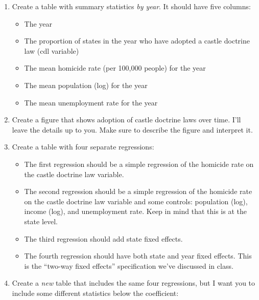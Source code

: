 \documentclass[
]{article}
\providecommand{\tightlist}{%
  \setlength{\itemsep}{0pt}\setlength{\parskip}{0pt}}
\begin{document}
\begin{enumerate}
\def\labelenumi{\arabic{enumi}.}
\tightlist
\item
  Create a table with summary statistics \emph{by year}. It should have five columns:

  \begin{itemize}
  \tightlist
  \item
    The year
  \item
    The proportion of states in the year who have adopted a castle doctrine law (cdl variable)
  \item
    The mean homicide rate (per 100,000 people) for the year
  \item
    The mean population (log) for the year
  \item
    The mean unemployment rate for the year
  \end{itemize}
\item
  Create a figure that shows adoption of castle doctrine laws over time. I'll leave the details up to you. Make sure to describe the figure and interpret it.
\item
  Create a table with four separate regressions:

  \begin{itemize}
  \tightlist
  \item
    The first regression should be a simple regression of the homicide rate on the castle doctrine law variable.
  \item
    The second regression should be a simple regression of the homicide rate on the castle doctrine law variable and some controls: population (log), income (log), and unemployment rate. Keep in mind that this is at the state level.
  \item
    The third regression should add state fixed effects.
  \item
    The fourth regression should have both state and year fixed effects. This is the ``two-way fixed effects'' specification we've discussed in class.
  \end{itemize}
\item
  Create a \emph{new} table that includes the same four regressions, but I want you to include some different statistics below the coefficient:


\end{enumerate}
\end{document}
